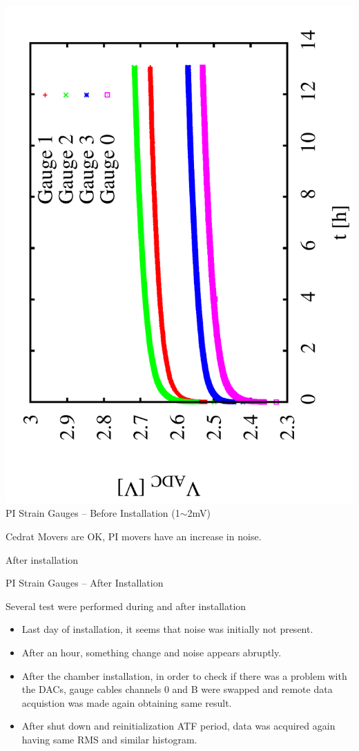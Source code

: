 \documentclass[a4paper,11pt]{book}
\begin{document}
 \includegraphics[angle=-90,scale=0.15]{image_ai_21b.pdf}\\ 
PI Strain Gauges -- Before Installation (1$\sim$2mV)\par
Cedrat Movers are {\color{green}OK}, PI movers have an {\color{red}increase in noise}.
\par
After installation\par
PI Strain Gauges -- After Installation\par
 Several test were performed during and after installation\par
 \begin{itemize}
  \item Last day of installation, it seems that noise was initially not present.
  \item After an hour, something change and noise appears abruptly.
  \item After the chamber installation, in order to check if there was a problem with the DACs, gauge cables channels 0 and B were swapped and remote data acquistion was made again obtaining same result.
  \item After shut down and reinitialization ATF period, data was acquired again having same RMS and similar histogram.
 \end{itemize}
\end{document}
